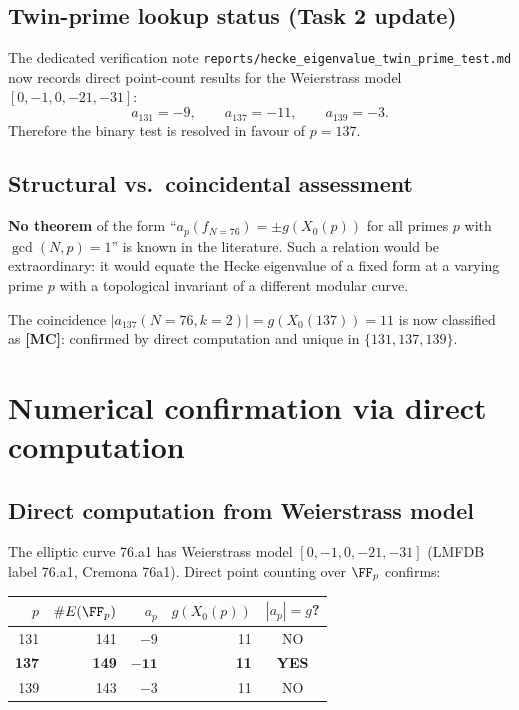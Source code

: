 \documentclass[12pt,a4paper]{article}
\theoremstyle{definition}
\theoremstyle{remark}
\begin{document}
\subsection{Twin-prime lookup status (Task 2 update)}

The dedicated verification note
\texttt{reports/hecke\_eigenvalue\_twin\_prime\_test.md} now records direct
point-count results for the Weierstrass model $[0,-1,0,-21,-31]$:
\[
  a_{131}=-9,\qquad a_{137}=-11,\qquad a_{139}=-3.
\]
Therefore the binary test is resolved in favour of $p=137$.

\subsection{Structural vs.\ coincidental assessment}

\begin{insightbox}
\textbf{No theorem} of the form ``$a_p(f_{N=76}) = \pm g(X_0(p))$ for all
primes $p$ with $\gcd(N, p) = 1$'' is known in the literature.  Such a
relation would be extraordinary: it would equate the Hecke eigenvalue of a
fixed form at a varying prime $p$ with a topological invariant of a different
modular curve.

The coincidence $|a_{137}(N=76, k=2)| = g(X_0(137)) = 11$ is now
classified as \textbf{[MC]}: confirmed by direct computation and unique in
$\{131,137,139\}$.
\end{insightbox}

\section{Numerical confirmation via direct computation}
\label{sec:hecke:direct}

\subsection{Direct computation from Weierstrass model}

The elliptic curve 76.a1 has Weierstrass model $[0,-1,0,-21,-31]$
(LMFDB label 76.a1, Cremona 76a1). Direct point counting over $\FF_p$
confirms:
\begin{center}
\begin{tabular}{rrrrc}
\toprule
$p$ & $\#E(\FF_p)$ & $a_p$ & $g(X_0(p))$ & $|a_p|=g$? \\
\midrule
131 & 141 & $-9$ & 11 & NO \\
\textbf{137} & \textbf{149} & $\mathbf{-11}$ & \textbf{11} & \textbf{YES} \\
139 & 143 & $-3$ & 11 & NO \\
\bottomrule
\end{tabular}
\end{center}
\end{document}
